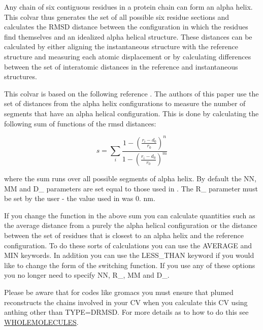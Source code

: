 Any chain of six contiguous residues in a protein chain can form an alpha helix. This colvar thus generates the set of all possible six residue sections and calculates the R\+M\+S\+D distance between the configuration in which the residues find themselves and an idealized alpha helical structure. These distances can be calculated by either aligning the instantaneous structure with the reference structure and measuring each atomic displacement or by calculating differences between the set of interatomic distances in the reference and instantaneous structures.

This colvar is based on the following reference \cite{pietrucci09jctc}. The authors of this paper use the set of distances from the alpha helix configurations to measure the number of segments that have an alpha helical configuration. This is done by calculating the following sum of functions of the rmsd distances\+:

\[ s = \sum_i \frac{ 1 - \left(\frac{r_i-d_0}{r_0}\right)^n } { 1 - \left(\frac{r_i-d_0}{r_0}\right)^m } \]

where the sum runs over all possible segments of alpha helix. By default the N\+N, M\+M and D\+\_ parameters are set equal to those used in \cite{pietrucci09jctc}. The R\+\_ parameter must be set by the user -\/ the value used in \cite{pietrucci09jctc} was 0. nm.

If you change the function in the above sum you can calculate quantities such as the average distance from a purely the alpha helical configuration or the distance between the set of residues that is closest to an alpha helix and the reference configuration. To do these sorts of calculations you can use the A\+V\+E\+R\+A\+G\+E and M\+I\+N keywords. In addition you can use the L\+E\+S\+S\+\_\+\+T\+H\+A\+N keyword if you would like to change the form of the switching function. If you use any of these options you no longer need to specify N\+N, R\+\_, M\+M and D\+\_.

Please be aware that for codes like gromacs you must ensure that plumed reconstructs the chains involved in your C\+V when you calculate this C\+V using anthing other than T\+Y\+P\+E=D\+R\+M\+S\+D. For more details as to how to do this see \hyperlink{WHOLEMOLECULES}{W\+H\+O\+L\+E\+M\+O\+L\+E\+C\+U\+L\+E\+S}.

